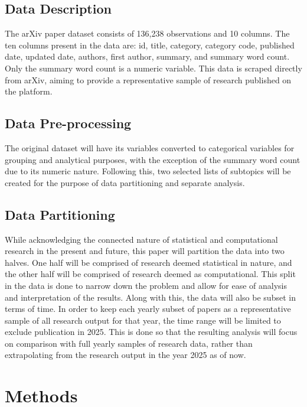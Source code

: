 \documentclass[
  12pt]{article}
\begin{document}
\subsection{Data Description}\label{data-description}

The arXiv paper dataset consists of 136,238 observations and 10 columns.
The ten columns present in the data are: id, title, category, category
code, published date, updated date, authors, first author, summary, and
summary word count. Only the summary word count is a numeric variable.
This data is scraped directly from arXiv, aiming to provide a
representative sample of research published on the platform.

\subsection{Data Pre-processing}\label{data-pre-processing}

The original dataset will have its variables converted to categorical
variables for grouping and analytical purposes, with the exception of
the summary word count due to its numeric nature. Following this, two
selected lists of subtopics will be created for the purpose of data
partitioning and separate analysis.

\subsection{Data Partitioning}\label{data-partitioning}

While acknowledging the connected nature of statistical and
computational research in the present and future, this paper will
partition the data into two halves. One half will be comprised of
research deemed statistical in nature, and the other half will be
comprised of research deemed as computational. This split in the data is
done to narrow down the problem and allow for ease of analysis and
interpretation of the results. Along with this, the data will also be
subset in terms of time. In order to keep each yearly subset of papers
as a representative sample of all research output for that year, the
time range will be limited to exclude publication in 2025. This is done
so that the resulting analysis will focus on comparison with full yearly
samples of research data, rather than extrapolating from the research
output in the year 2025 as of now.

\section{Methods}\label{sec-meth}
\end{document}
